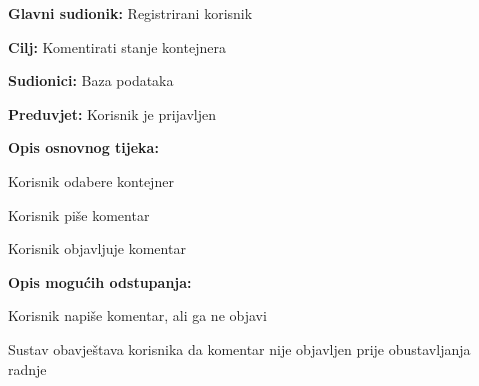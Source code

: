 			\noindent {}
			\begin{packed_item}
				
				\item \textbf{Glavni sudionik:} Registrirani korisnik
				\item  \textbf{Cilj:} Komentirati stanje kontejnera
				\item  \textbf{Sudionici:} Baza podataka
				\item  \textbf{Preduvjet:} Korisnik je prijavljen
				\item  \textbf{Opis osnovnog tijeka:}
				
				\item[] \begin{packed_enum}
					
					\item Korisnik odabere kontejner
					\item Korisnik piše komentar
					\item Korisnik objavljuje komentar
					
				\end{packed_enum}
				
				\item  \textbf{Opis mogućih odstupanja:}
				
				\item[] \begin{packed_item}
					
					\item[2.a] Korisnik napiše komentar, ali ga ne objavi
					\item[] \begin{packed_enum}
						
						\item Sustav obavještava korisnika da komentar nije objavljen prije obustavljanja radnje
						
					\end{packed_enum}
					
				\end{packed_item}
			\end{packed_item}
			
